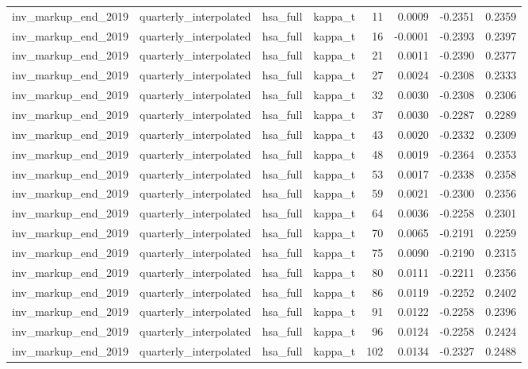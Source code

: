 \begin{tabular}{llllrrrr}
inv\_markup\_end\_2019 & quarterly\_interpolated & hsa\_full & kappa\_t & 11 & 0.0009 & -0.2351 & 0.2359 \\
inv\_markup\_end\_2019 & quarterly\_interpolated & hsa\_full & kappa\_t & 16 & -0.0001 & -0.2393 & 0.2397 \\
inv\_markup\_end\_2019 & quarterly\_interpolated & hsa\_full & kappa\_t & 21 & 0.0011 & -0.2390 & 0.2377 \\
inv\_markup\_end\_2019 & quarterly\_interpolated & hsa\_full & kappa\_t & 27 & 0.0024 & -0.2308 & 0.2333 \\
inv\_markup\_end\_2019 & quarterly\_interpolated & hsa\_full & kappa\_t & 32 & 0.0030 & -0.2308 & 0.2306 \\
inv\_markup\_end\_2019 & quarterly\_interpolated & hsa\_full & kappa\_t & 37 & 0.0030 & -0.2287 & 0.2289 \\
inv\_markup\_end\_2019 & quarterly\_interpolated & hsa\_full & kappa\_t & 43 & 0.0020 & -0.2332 & 0.2309 \\
inv\_markup\_end\_2019 & quarterly\_interpolated & hsa\_full & kappa\_t & 48 & 0.0019 & -0.2364 & 0.2353 \\
inv\_markup\_end\_2019 & quarterly\_interpolated & hsa\_full & kappa\_t & 53 & 0.0017 & -0.2338 & 0.2358 \\
inv\_markup\_end\_2019 & quarterly\_interpolated & hsa\_full & kappa\_t & 59 & 0.0021 & -0.2300 & 0.2356 \\
inv\_markup\_end\_2019 & quarterly\_interpolated & hsa\_full & kappa\_t & 64 & 0.0036 & -0.2258 & 0.2301 \\
inv\_markup\_end\_2019 & quarterly\_interpolated & hsa\_full & kappa\_t & 70 & 0.0065 & -0.2191 & 0.2259 \\
inv\_markup\_end\_2019 & quarterly\_interpolated & hsa\_full & kappa\_t & 75 & 0.0090 & -0.2190 & 0.2315 \\
inv\_markup\_end\_2019 & quarterly\_interpolated & hsa\_full & kappa\_t & 80 & 0.0111 & -0.2211 & 0.2356 \\
inv\_markup\_end\_2019 & quarterly\_interpolated & hsa\_full & kappa\_t & 86 & 0.0119 & -0.2252 & 0.2402 \\
inv\_markup\_end\_2019 & quarterly\_interpolated & hsa\_full & kappa\_t & 91 & 0.0122 & -0.2258 & 0.2396 \\
inv\_markup\_end\_2019 & quarterly\_interpolated & hsa\_full & kappa\_t & 96 & 0.0124 & -0.2258 & 0.2424 \\
inv\_markup\_end\_2019 & quarterly\_interpolated & hsa\_full & kappa\_t & 102 & 0.0134 & -0.2327 & 0.2488 \\

\end{tabular}
